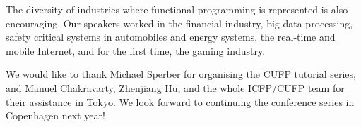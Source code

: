 \documentclass{jfp1}
\begin{document}
The diversity of industries where functional programming is represented is also
encouraging.  Our speakers worked in the financial industry, big data
processing, safety critical systems in automobiles and energy systems, the
real-time and mobile Internet, and for the first time, the gaming industry.

We would like to thank Michael Sperber for organising the CUFP tutorial series,
and Manuel Chakravarty, Zhenjiang Hu, and the whole ICFP/CUFP team for their
assistance in Tokyo. We look forward to continuing the conference series in
Copenhagen next year!


\end{document}
